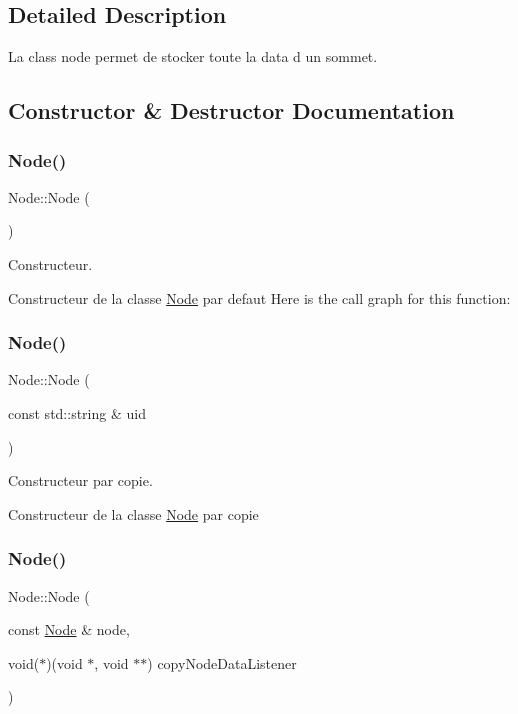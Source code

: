 \subsection{Detailed Description}
La class node permet de stocker toute la data d un sommet. 

\subsection{Constructor \& Destructor Documentation}
\mbox{\label{class_node_ad7a34779cad45d997bfd6d3d8043c75f}} 
\subsubsection{\texorpdfstring{Node()}{Node()}\hspace{0.1cm}{\footnotesize\ttfamily [1/3]}}
{\footnotesize\ttfamily Node\+::\+Node (\begin{DoxyParamCaption}{ }\end{DoxyParamCaption})}



Constructeur. 

Constructeur de la classe \mbox{\hyperlink{class_node}{Node}} par defaut Here is the call graph for this function\+:
\mbox{\label{class_node_a639cdb8009e80b20bfdb0575c765c713}} 
\subsubsection{\texorpdfstring{Node()}{Node()}\hspace{0.1cm}{\footnotesize\ttfamily [2/3]}}
{\footnotesize\ttfamily Node\+::\+Node (\begin{DoxyParamCaption}\item[{const std\+::string \&}]{uid }\end{DoxyParamCaption})}



Constructeur par copie. 

Constructeur de la classe \mbox{\hyperlink{class_node}{Node}} par copie \mbox{\label{class_node_a2d318229a996fe2654bf53428a4ff283}} 
\subsubsection{\texorpdfstring{Node()}{Node()}\hspace{0.1cm}{\footnotesize\ttfamily [3/3]}}
{\footnotesize\ttfamily Node\+::\+Node (\begin{DoxyParamCaption}\item[{const \mbox{\hyperlink{class_node}{Node}} \&}]{node,  }\item[{void($\ast$)(void $\ast$, void $\ast$$\ast$)}]{copy\+Node\+Data\+Listener }\end{DoxyParamCaption})}



